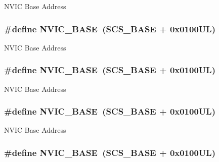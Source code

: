 N\-V\-I\-C Base Address \hypertarget{group___c_m_s_i_s__core__base_gaa0288691785a5f868238e0468b39523d}{
\subsubsection[{N\-V\-I\-C\-\_\-\-B\-A\-S\-E}]{\setlength{\rightskip}{0pt plus 5cm}\#define N\-V\-I\-C\-\_\-\-B\-A\-S\-E~({\bf S\-C\-S\-\_\-\-B\-A\-S\-E} +  0x0100\-U\-L)}}\label{group___c_m_s_i_s__core__base_gaa0288691785a5f868238e0468b39523d}
N\-V\-I\-C Base Address \hypertarget{group___c_m_s_i_s__core__base_gaa0288691785a5f868238e0468b39523d}{
\subsubsection[{N\-V\-I\-C\-\_\-\-B\-A\-S\-E}]{\setlength{\rightskip}{0pt plus 5cm}\#define N\-V\-I\-C\-\_\-\-B\-A\-S\-E~({\bf S\-C\-S\-\_\-\-B\-A\-S\-E} +  0x0100\-U\-L)}}\label{group___c_m_s_i_s__core__base_gaa0288691785a5f868238e0468b39523d}
N\-V\-I\-C Base Address \hypertarget{group___c_m_s_i_s__core__base_gaa0288691785a5f868238e0468b39523d}{
\subsubsection[{N\-V\-I\-C\-\_\-\-B\-A\-S\-E}]{\setlength{\rightskip}{0pt plus 5cm}\#define N\-V\-I\-C\-\_\-\-B\-A\-S\-E~({\bf S\-C\-S\-\_\-\-B\-A\-S\-E} +  0x0100\-U\-L)}}\label{group___c_m_s_i_s__core__base_gaa0288691785a5f868238e0468b39523d}
N\-V\-I\-C Base Address \hypertarget{group___c_m_s_i_s__core__base_gaa0288691785a5f868238e0468b39523d}{
\subsubsection[{N\-V\-I\-C\-\_\-\-B\-A\-S\-E}]{\setlength{\rightskip}{0pt plus 5cm}\#define N\-V\-I\-C\-\_\-\-B\-A\-S\-E~({\bf S\-C\-S\-\_\-\-B\-A\-S\-E} +  0x0100\-U\-L)}}\label{group___c_m_s_i_s__core__base_gaa0288691785a5f868238e0468b39523d}
